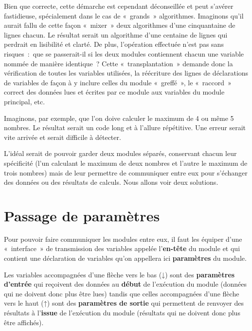 
	Bien que correcte, cette démarche est cependant déconseillée et peut
	s’avérer fastidieuse, spécialement dans le cas de «~grands~»
	algorithmes. Imaginons qu’il aurait fallu de cette façon «~mixer~» deux
	algorithmes d’une cinquantaine de lignes chacun. Le résultat serait un
	algorithme d’une centaine de lignes qui perdrait en lisibilité et
	clarté. De plus, l’opération effectuée n’est pas sans risques~:~que se
	passerait-il si les deux modules contiennent chacun une variable nommée
	de manière identique~? Cette «~transplantation~» demande donc la
	vérification de toutes les variables utilisées, la réécriture des
	lignes de déclarations de variables de façon à y inclure celles du
	module «~greffé~», le «~raccord~» correct des données lues et écrites
	par ce module aux variables du module principal, etc.
	
	Imaginons, par exemple, que l’on doive calculer le
	maximum de 4 ou même 5 nombres. Le résultat serait un code long et
	à l’allure répétitive. Une erreur serait vite arrivée et
	serait difficile à détecter.
	
	L’idéal serait de pouvoir garder deux modules séparés, conservant chacun
	leur spécificité (l’un calculant le maximum de deux nombres et l’autre
	le maximum de trois nombres) mais de leur permettre de communiquer
	entre eux pour s’échanger des données ou des résultats de calculs. Nous
	allons voir deux solutions.

\section{Passage de paramètres}

	Pour pouvoir faire communiquer les modules entre eux, il faut les
	équiper d’une «~interface~» de transmission des variables appelée
	l’\textbf{en-tête} du module et qui contient une déclaration de
	variables qu’on appellera ici \textbf{paramètres} du module. 
	
	Les variables accompagnées d’une flèche vers le bas (\textsf{↓}) sont
	des \textbf{paramètres d’entrée} qui reçoivent des données au
	\textbf{début} de l’exécution du module (données qui ne doivent donc
	plus être lues) tandis que celles accompagnées d’une flèche vers le
	haut (\textsf{↑}) sont des \textbf{paramètres de sortie} qui permettent
	de renvoyer des résultats à l’\textbf{issue} de l’exécution du module
	(résultats qui ne doivent donc plus être affichés). 

